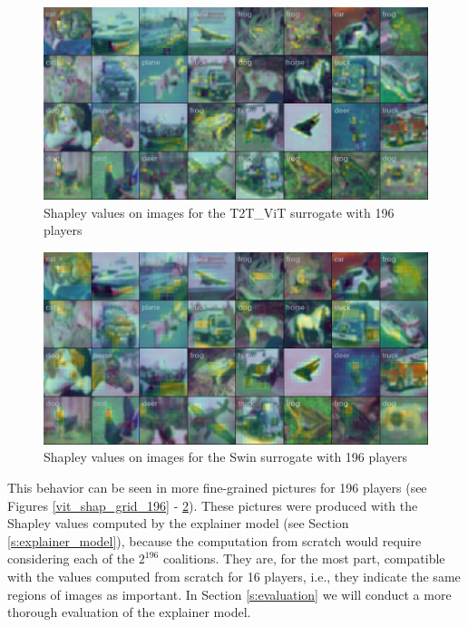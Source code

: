 \documentclass[en]{pracamgr}
\begin{document}
\begin{figure}[H]
\centering
\includegraphics[scale=0.4]{./images/t2t_vit_shap_grid_196.png}
\caption{Shapley values on images for the T2T\_ViT surrogate with 196 players}
\label{t2t_vit_shap_grid_196}
\end{figure}


\begin{figure}[H]
\centering
\includegraphics[scale=0.4]{./images/swin_shap_grid_196.png}
\caption{Shapley values on images for the Swin surrogate with 196 players}
\label{swin_shap_grid_196}
\end{figure}

\pagebreak


This behavior can be seen in more fine-grained pictures for 196 players (see Figures \ref{vit_shap_grid_196} - \ref{swin_shap_grid_196}). These pictures were produced with the Shapley values computed by the explainer model (see Section \ref{s:explainer_model}), because the computation from scratch would require considering each of the $2^{196}$ coalitions. They are, for the most part, compatible with the values computed from scratch for 16 players, i.e., they indicate the same regions of images as important. In Section \ref{s:evaluation} we will conduct a more thorough evaluation of the explainer model.
\end{document}
